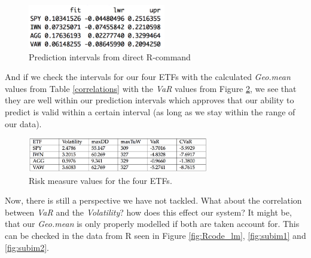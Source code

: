 \documentclass{article}
\begin{document}
\begin{figure}[h!]
\centering
\includegraphics[width=6cm]{fig/Rcode_PInt.png}
\caption{Prediction intervals from direct R-command}
\label{fig:Rcode_PInt}
\end{figure}

And if we check the intervals for our four ETFs with the calculated \textit{Geo.mean} values from Table \ref{correlations} with the \textit{VaR} values from Figure \ref{RiskTable}, we see that they are well within our prediction intervals which approves that our ability to predict is valid within a certain interval (as long as we stay within the range of our data). \\

\begin{figure}[h!]
\centering
\includegraphics[width=0.7\textwidth]{fig/RiskTable.png}
\caption{Risk measure values for the four ETFs.}
\label{RiskTable}
\end{figure}

Now, there is still a perspective we have not tackled. What about the correlation between \textit{VaR} and the \textit{Volatility}? how does this effect our system? It might be, that our \textit{Geo.mean} is only properly modelled if both are taken account for. This can be checked in the data from R seen in Figure \ref{fig:Rcode_lm}, \ref{fig:subim1} and \ref{fig:subim2}. 
\end{document}
